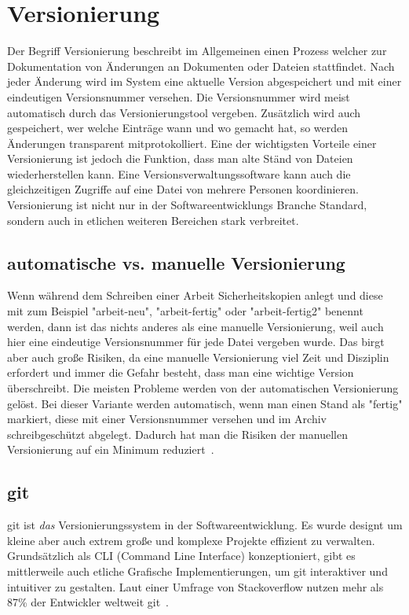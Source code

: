 \section{Versionierung}
Der Begriff Versionierung beschreibt im Allgemeinen einen Prozess welcher zur Dokumentation von Änderungen an Dokumenten oder Dateien stattfindet.
Nach jeder Änderung wird im System eine aktuelle Version abgespeichert und mit einer eindeutigen Versionsnummer versehen.
Die Versionsnummer wird meist automatisch durch das Versionierungstool vergeben.
Zusätzlich wird auch gespeichert, wer welche Einträge wann und wo gemacht hat, so werden Änderungen transparent mitprotokolliert.
Eine der wichtigsten Vorteile einer Versionierung ist jedoch die Funktion, dass man alte Ständ von Dateien wiederherstellen kann.
Eine Versionsverwaltungssoftware kann auch die gleichzeitigen Zugriffe auf eine Datei von mehrere Personen koordinieren.
Versionierung ist nicht nur in der Softwareentwicklungs Branche Standard, sondern auch in etlichen weiteren Bereichen stark
verbreitet.

\subsection{automatische vs. manuelle Versionierung}
Wenn während dem Schreiben einer Arbeit Sicherheitskopien anlegt und diese mit zum Beispiel "arbeit-neu",
"arbeit-fertig" oder "arbeit-fertig2" benennt werden, dann ist das nichts anderes als eine manuelle Versionierung, weil auch hier
eine eindeutige Versionsnummer für jede Datei vergeben wurde.
Das birgt aber auch große Risiken, da eine manuelle Versionierung viel Zeit und Disziplin erfordert und immer die Gefahr
besteht, dass man eine wichtige Version überschreibt.
Die meisten Probleme werden von der automatischen Versionierung gelöst.
Bei dieser Variante werden automatisch, wenn man einen Stand als "fertig" markiert, diese mit einer Versionsnummer versehen
und im Archiv schreibgeschützt abgelegt.
Dadurch hat man die Risiken der manuellen Versionierung auf ein Minimum reduziert~\cite{versionierung}.

\subsection{git}
git ist \emph{das} Versionierungssystem in der Softwareentwicklung.
Es wurde designt um kleine aber auch extrem große und komplexe Projekte effizient zu verwalten.
Grundsätzlich als CLI (Command Line Interface) konzeptioniert, gibt es mittlerweile auch etliche Grafische Implementierungen,
um git interaktiver und intuitiver zu gestalten.
Laut einer Umfrage von Stackoverflow nutzen mehr als 87\% der Entwickler weltweit git~\cite{stackoverflow-git-survey}.

